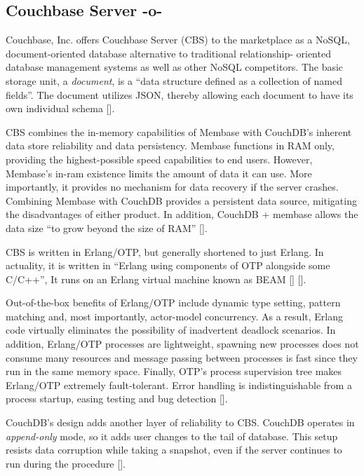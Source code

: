 \subsection{Couchbase Server -o-}


Couchbase, Inc. offers Couchbase Server (CBS) to the marketplace as a
NoSQL, document-oriented database alternative to traditional
relationship- oriented database management systems as well as other
NoSQL competitors.  The basic storage unit, a \textit{document}, is a ``data
structure defined as a collection of named fields''.  The document
utilizes JSON, thereby allowing each document to have its own
individual schema [\cite{www-infoworld-cbs}].

CBS combines the in-memory capabilities of Membase with CouchDB's
inherent data store reliability and data persistency.  Membase
functions in RAM only, providing the highest-possible speed
capabilities to end users.  However, Membase's in-ram existence limits
the amount of data it can use.  More importantly, it provides no
mechanism for data recovery if the server crashes.  Combining Membase
with CouchDB provides a persistent data source, mitigating the
disadvantages of either product.  In addition, CouchDB + membase
allows the data size ``to grow beyond the size of RAM''
 [\cite{www-safaribooks-cbs}].

CBS is written in Erlang/OTP, but generally shortened to just Erlang.
In actuality, it is written in ``Erlang using components of OTP
alongside some C/C++'', It runs on an Erlang virtual machine known as
BEAM [\cite{www-wikipedia-erlang-cbs}] [\cite{www-erlangcentral-cbs}].

Out-of-the-box benefits of Erlang/OTP include dynamic type setting,
pattern matching and, most importantly, actor-model concurrency.  As a
result, Erlang code virtually eliminates the possibility of
inadvertent deadlock scenarios.  In addition, Erlang/OTP processes are
lightweight, spawning new processes does not consume many resources
and message passing between processes is fast since they run in the
same memory space.  Finally, OTP's process supervision tree makes
Erlang/OTP extremely fault-tolerant.  Error handling is
indistinguishable from a process startup, easing testing and bug
detection [\cite{www-couchbase-blog-cbs}].

CouchDB's design adds another layer of reliability to CBS.  CouchDB
operates in \textit{append-only} mode, so it adds user changes to the tail of
database.  This setup resists data corruption while taking a snapshot,
even if the server continues to run during the
procedure [\cite{www-hightower-cbs}].

